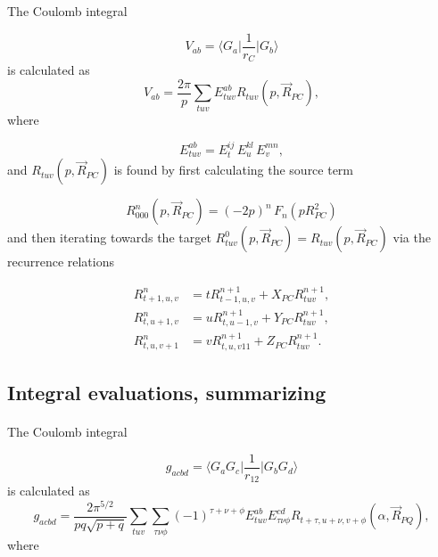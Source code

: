 \documentclass[%
twoside,                 %
final,                   %
10pt]{article}
\begin{document}
The Coulomb integral

\begin{equation}
 V_{ab} = \langle G_a\vert\frac{1}{r_C}\vert G_b\rangle
\end{equation}
is calculated as
\begin{equation}
 V_{ab} = \frac{2\pi}{p}\sum_{tuv}E^{ab}_{tuv} R_{tuv}(p,\vec R_{PC}),
\end{equation}
where

\begin{equation}
 E^{ab}_{tuv} = E^{ij}_t\,E^{kl}_u\,E^{mn}_v,
\end{equation}
and $R_{tuv}(p,\vec R_{PC})$ is found by first calculating the source term

\begin{equation}
 R^n_{000}(p,\vec R_{PC}) = (-2p)^n\,F_n(p R^2_{PC})
\end{equation}
and then iterating towards the target $R^0_{tuv}(p,\vec R_{PC}) = R_{tuv}(p,\vec R_{PC})$ via the recurrence relations

\begin{equation}
 \begin{split}
  R^n_{t+1,u,v} & = tR^{n+1}_{t-1,u,v} + X_{PC} R^{n+1}_{tuv}, \\
  R^n_{t,u+1,v} & = uR^{n+1}_{t,u-1,v} + Y_{PC} R^{n+1}_{tuv}, \\
  R^n_{t,u,v+1} & = vR^{n+1}_{t,u,v11} + Z_{PC} R^{n+1}_{tuv}.
 \end{split}
\end{equation}


\subsection*{Integral evaluations, summarizing}

\paragraph{}

The Coulomb integral

\begin{equation}
 g_{acbd} = \langle G_a G_c\vert \frac{1}{r_{12}}\vert G_b G_d\rangle
\end{equation}
is calculated as
\begin{equation}
 g_{acbd} = \frac{2\pi^{5/2}}{pq\sqrt{p+q}}\sum_{tuv}\sum_{\tau\nu\phi}(-1)^{\tau+\nu+\phi}E^{ab}_{tuv}E^{cd}_{\tau\nu\phi}R_{t+\tau,u+\nu,v+\phi}(\alpha,\vec R_{PQ}),
\end{equation}
where
\end{document}
